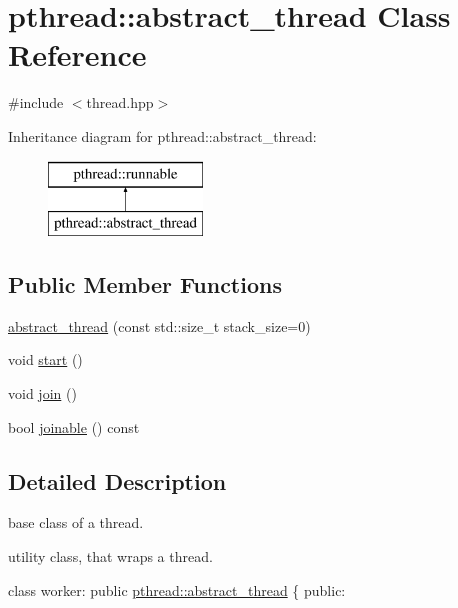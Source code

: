 \hypertarget{classpthread_1_1abstract__thread}{}\section{pthread\+:\+:abstract\+\_\+thread Class Reference}
\label{classpthread_1_1abstract__thread}


{\ttfamily \#include $<$thread.\+hpp$>$}

Inheritance diagram for pthread\+:\+:abstract\+\_\+thread\+:\begin{figure}[H]
\begin{center}
\leavevmode
\includegraphics[height=2.000000cm]{classpthread_1_1abstract__thread}
\end{center}
\end{figure}
\subsection*{Public Member Functions}
\begin{DoxyCompactItemize}
\item 
\hyperlink{classpthread_1_1abstract__thread_aef9de5da73087b69d00f71985a4cbdef}{abstract\+\_\+thread} (const std\+::size\+\_\+t stack\+\_\+size=0)
\item 
void \hyperlink{classpthread_1_1abstract__thread_ab121718028f3ca68d45db84d10ff2a3a}{start} ()
\item 
void \hyperlink{classpthread_1_1abstract__thread_a2fb144a8b7d368ed7c4e193cfb89489d}{join} ()
\item 
bool \hyperlink{classpthread_1_1abstract__thread_ab09402f41e10770eb9987fda101ad827}{joinable} () const 
\end{DoxyCompactItemize}


\subsection{Detailed Description}
base class of a thread.

utility class, that wraps a thread. 
\begin{DoxyPre}{\ttfamily 
class worker: public \hyperlink{classpthread_1_1abstract__thread}{pthread::abstract\_thread} \{
public:}\end{DoxyPre}



